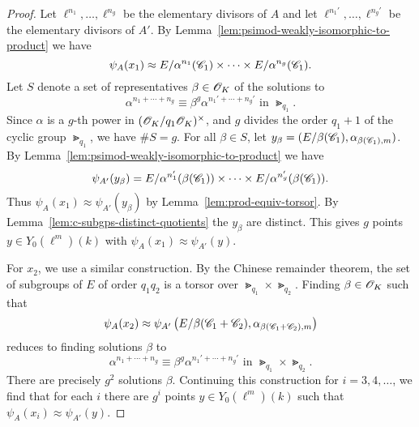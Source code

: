 \documentclass{amsart}
\begin{document}
\begin{proof}
Let $\ell^{n_1},\dots,\ell^{n_g}$ be the elementary divisors of $A$  and let $\ell^{n_1'},\dots,\ell^{n_g'}$ be the elementary divisors of $A'$.
By Lemma~\ref{lem:psimod-weakly-isomorphic-to-product} we have $$\psi_{A}(x_1) \approx E/\alpha^{n_1}(\mathscr{C}_1) \times \cdots \times E/\alpha^{n_g}(\mathscr{C}_1).$$
    Let $S$ denote a set of representatives $\beta \in \mathscr{O}_K$ of the solutions to %
    \[
      \alpha^{n_1 + \cdots + n_g} \equiv \beta^g\alpha^{n_1' + \cdots + n_g'}
      \text{ in } \Gt_{q_1}.
    \]
Since $\alpha$ is a $g$-th power in  $(\mathscr{O}_K/q_1\mathscr{O}_K)^\times$, and  $g$ divides the order $q_1 + 1$ of the cyclic group $\Gt_{q_1}$,
   we have $\#S = g$. For all $\beta \in S$, let $y_\beta = (E/\beta(\mathscr{C}_1),\alpha_{\beta(\mathscr{C}_1),m})$. By Lemma~\ref{lem:psimod-weakly-isomorphic-to-product} we have $$\psi_{A'}(y_\beta) = E/\alpha^{n_1'}(\beta(\mathscr{C}_1)) \times \cdots \times E/\alpha^{n_g'}(\beta(\mathscr{C}_1)).$$ Thus $\psi_A(x_1) \approx \psi_{A'}(y_\beta)$ by Lemma~\ref{lem:prod-equiv-torsor}. By Lemma~\ref{lem:c-subgps-distinct-quotients} the $y_\beta$ are distinct. This gives $g$ points $y \in Y_0(\ell^m)(k)$ with $\psi_{A}(x_1) \approx \psi_{A'}(y)$.

  For $x_2$, we use a similar construction. By the Chinese remainder theorem, the set of subgroups of $E$ of order $q_1q_2$ is a torsor over $\Gt_{q_1} \times \Gt_{q_2}$. Finding $\beta \in \mathscr{O}_K$ such that
  \[
    \psi_{A}(x_2) \approx \psi_{A'}\left(E/\beta(\mathscr{C}_1+\mathscr{C}_2),\alpha_{\beta(\mathscr{C}_1+\mathscr{C}_2),m}\right)
  \]
  reduces to finding solutions $\beta$ to %
  \[
    \alpha^{n_1 + \cdots + n_g} \equiv \beta^g\alpha^{n_1' + \cdots + n_g'}
    \text{ in } \Gt_{q_1} \times \Gt_{q_2}.
  \]
There are precisely $g^2$ solutions $\beta$. Continuing this construction for $i=3,4,\dots$, we find that for each $i$ there are $g^i$ points $y \in Y_0(\ell^m)(k)$ such that $\psi_{A}(x_i) \approx \psi_{A'}(y)$.
\end{proof}
\end{document}
